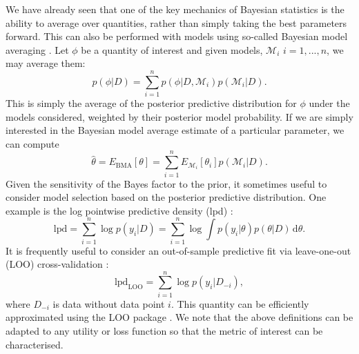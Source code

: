 \documentclass[12pt,english, journal=jpr, layout=twocolumn]{article}
\begin{document}
We have already seen that one of the key mechanics of Bayesian statistics is the ability to average over quantities, rather than simply taking the best parameters forward. This can also be performed with models using so-called Bayesian model averaging \citep{Raftery::1997}. Let $\phi$ be a quantity of interest and given models, $\mathcal{M}_i$ $i = 1,..., n$, we may average them:
\begin{equation}
p(\phi|D) = \sum_{i = 1}^{n}p(\phi|D, \mathcal{M}_i)p(\mathcal{M}_i|D).
\end{equation}
This is simply the average of the posterior predictive distribution for $\phi$ under the models considered, weighted by their posterior model probability. If we are simply interested in the Bayesian model average estimate of a particular parameter, we can compute
\begin{equation}
\hat{\theta} = E_{\text{BMA}}[\theta] = \sum_{i = 1}^{n}E_{\mathcal{M}_i}[\theta_i] p(\mathcal{M}_i|D).
\end{equation}
Given the sensitivity of the Bayes factor to the prior, it sometimes useful to consider model selection based on the posterior predictive distribution. One example is the log pointwise predictive density (lpd) \citep{Vehtari::2017}:
\begin{equation}
\text{lpd} = \sum_{i = 1}^n \log p(y_i|D) = \sum_{i = 1}^n \log \int p(y_i|\theta)p(\theta|D)\, \text{d}\theta.
\end{equation}
It is frequently useful to consider an out-of-sample predictive fit via leave-one-out (LOO) cross-validation \citep{Vehtari::2017}:
\begin{equation}
\text{lpd}_\text{LOO} = \sum_{i = 1}^{n}\log p(y_i| D_{-i}),
\end{equation}
where $D_{-i}$ is data without data point $i$. This quantity can be efficiently approximated using the LOO package \citep{Vehtari::2017}. We note that the above definitions can be adapted to any utility or loss function so that the metric of interest can be characterised.
\end{document}
